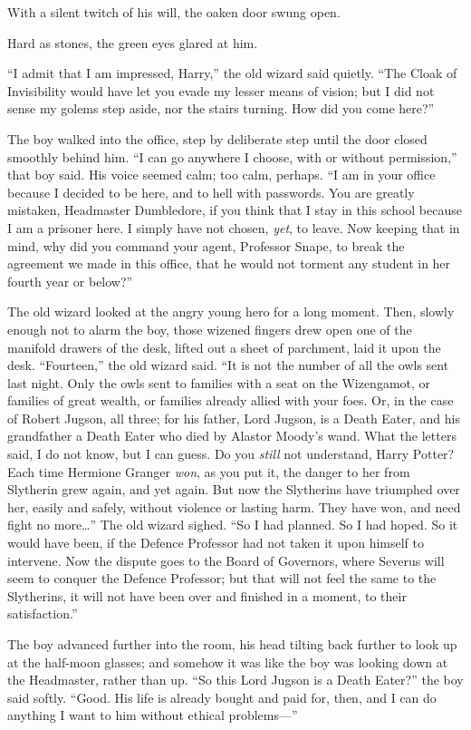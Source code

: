 With a silent twitch of his will, the oaken door swung open.

Hard as stones, the green eyes glared at him.

``I admit that I am impressed, Harry,'' the old wizard said quietly.
``The Cloak of Invisibility would have let you evade my lesser means of
vision; but I did not sense my golems step aside, nor the stairs
turning. How did you come here?''

The boy walked into the office, step by deliberate step until the door
closed smoothly behind him. ``I can go anywhere I choose, with or
without permission,'' that boy said. His voice seemed calm; too calm,
perhaps. ``I am in your office because I decided to be here, and to hell
with passwords. You are greatly mistaken, Headmaster Dumbledore, if you
think that I stay in this school because I am a prisoner here. I simply
have not chosen, \emph{yet}, to leave. Now keeping that in mind, why did
you command your agent, Professor Snape, to break the agreement we made
in this office, that he would not torment any student in her fourth year
or below?''

The old wizard looked at the angry young hero for a long moment. Then,
slowly enough not to alarm the boy, those wizened fingers drew open one
of the manifold drawers of the desk, lifted out a sheet of parchment,
laid it upon the desk. ``Fourteen,'' the old wizard said. ``It is not
the number of all the owls sent last night. Only the owls sent to
families with a seat on the Wizengamot, or families of great wealth, or
families already allied with your foes. Or, in the case of Robert
Jugson, all three; for his father, Lord Jugson, is a Death Eater, and
his grandfather a Death Eater who died by Alastor Moody's wand. What the
letters said, I do not know, but I can guess. Do you \emph{still} not
understand, Harry Potter? Each time Hermione Granger \emph{won}, as you
put it, the danger to her from Slytherin grew again, and yet again. But
now the Slytherins have triumphed over her, easily and safely, without
violence or lasting harm. They have won, and need fight no
more\ldots{}'' The old wizard sighed. ``So I had planned. So I had
hoped. So it would have been, if the Defence Professor had not taken it
upon himself to intervene. Now the dispute goes to the Board of
Governors, where Severus will seem to conquer the Defence Professor; but
that will not feel the same to the Slytherins, it will not have been
over and finished in a moment, to their satisfaction.''

The boy advanced further into the room, his head tilting back further to
look up at the half-moon glasses; and somehow it was like the boy was
looking down at the Headmaster, rather than up. ``So this Lord Jugson is
a Death Eater?'' the boy said softly. ``Good. His life is already bought
and paid for, then, and I can do anything I want to him without ethical
problems---''

